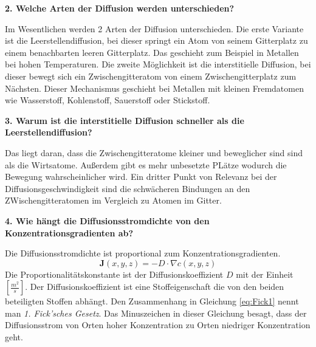 \noindent\textbf{2. Welche Arten der Diffusion werden unterschieden?}\\
\begin{addmargin}[25pt]{0pt}
Im Wesentlichen werden 2 Arten der Diffusion unterschieden. Die erste Variante ist die Leerstellendiffusion, bei dieser springt ein Atom von seinem Gitterplatz zu einem benachbarten leeren Gitterplatz. Das geschieht zum Beispiel in Metallen bei hohen Temperaturen. Die zweite Möglichkeit ist die interstitielle Diffusion, bei dieser bewegt sich ein Zwischengitteratom von einem Zwischengitterplatz zum Nächsten.  Dieser Mechanismus geschieht bei Metallen mit kleinen Fremdatomen wie Wasserstoff, Kohlenstoff, Sauerstoff oder Stickstoff.\\
\end{addmargin} 

\noindent\textbf{3. Warum ist die interstitielle Diffusion schneller als die Leerstellendiffusion?}\\
\begin{addmargin}[25pt]{0pt}
Das liegt daran, dass die Zwischengitteratome kleiner und beweglicher sind sind als die Wirtsatome. Außerdem gibt es mehr unbesetzte PLätze wodurch die Bewegung wahrscheinlicher wird. Ein dritter Punkt von Relevanz bei der Diffusionsgeschwindigkeit sind die schwächeren Bindungen an den ZWischengitteratomen im Vergleich zu Atomen im Gitter. \\
\end{addmargin} 

\noindent\textbf{4. Wie hängt die Diffusionsstromdichte von den Konzentrationsgradienten ab?}\\
\begin{addmargin}[25pt]{0pt}
Die Diffusionsstromdichte ist proportional zum Konzentrationsgradienten. 
\begin{equation}\label{eq:Fick1}
    \mathbf{J}(x,y,z) = -D\cdot \nabla c(x,y,z) 
\end{equation}
Die Proportionalitätskonstante ist der Diffusionskoeffizient $D$ mit der Einheit $\left[ \frac{\si{m}^2}{\si{s}}\right]$. Der Diffusionskoeffizient ist eine Stoffeigenschaft die von den beiden beteiligten Stoffen abhängt. Den Zusammenhang in Gleichung \ref{eq:Fick1} nennt man \textit{1. Fick'sches Gesetz}. Das Minuszeichen in dieser Gleichung besagt, dass der Diffusionsstrom von Orten hoher Konzentration zu Orten niedriger Konzentration geht.\\
\end{addmargin} 

